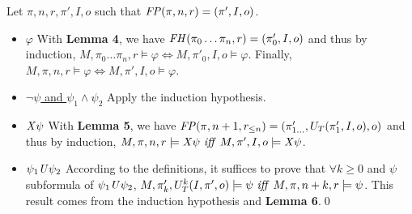 Let $\pi,n,r,\pi',I,o$ such that $\mathit{FP}(\pi,n,r)=(\pi',I,o)$.
\begin{itemize}
\item\underline{$\varphi$} With \textbf{Lemma 4}, we have $\mathit{FH}(\pi_0\dots\pi_n,r)=(\pi'_0,I,o)$ and thus by induction, $M,\pi_0\dots\pi_n,r\models\varphi\iff M,\pi'_0,I,o\models\varphi$. Finally, $M,\pi,n,r\models\varphi\iff M,\pi',I,o\models\varphi$.
\item\underline{$\neg\psi$ and $\psi_1\wedge\psi_2$} Apply the induction hypothesis.
\item\underline{$\mathit{X}\psi$} With \textbf{Lemma 5}, we have $\mathit{FP}(\pi,n+1,r_{\leq n})=(\pi'_{1\dots},U_T(\pi'_1,I,o),o)$ and thus by induction,
$M,\pi,n,r\models\mathit{X}\psi\ \mathit{iff}\  M,\pi',I,o\models\mathit{X}\psi$.
\item\underline{$\psi_1\mathit{U}\psi_2$} According to the definitions, it suffices to prove that $\forall k\geq 0$ and $\psi$ subformula of $\psi_1\mathit{U}\psi_2$,
$M,\pi'_k,U_T^k(I,\pi',o)\models\psi\ \mathit{iff}\  M,\pi,n+k,r\models\psi$. This result comes from the induction hypothesis and \textbf{Lemma 6}.\qed
\end{itemize}
